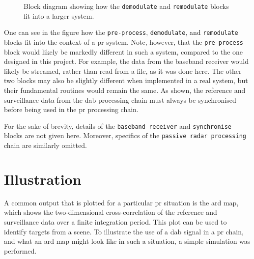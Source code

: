 \documentclass[class=report,11pt,crop=false]{standalone}
\begin{document}
\begin{figure}[htbp]
    \centering
    \captionsetup{type=figure}
    \def\svgwidth{\linewidth}
    { %
    \scriptsize
    }
    \caption{Block diagram showing how the \texttt{demodulate} and \texttt{remodulate} blocks fit into a larger  system.}
    \label{fig:BD_pr-integration}
\end{figure}

One can see in the figure how the \texttt{pre-process}, \texttt{demodulate}, and \texttt{remodulate} blocks fit into the context of a \gls{pr} system. Note, however, that the \texttt{pre-process} block would likely be markedly different in such a system, compared to the one designed in this project. For example, the data from the baseband receiver would likely be streamed, rather than read from a file, as it was done here. The other two blocks may also be slightly different when implemented in a real system, but their fundamental routines would remain the same. As shown, the reference and surveillance data from the \gls{dab} processing chain must always be synchronised before being used in the \gls{pr} processing chain.

For the sake of brevity, details of the \texttt{baseband receiver} and \texttt{synchronise} blocks are not given here. Moreover, specifics of the \texttt{passive radar processing} chain are similarly omitted.

\section{Illustration}
A common output that is plotted for a particular \gls{pr} situation is the \gls{ard} map, which shows the two-dimensional cross-correlation of the reference and surveillance data over a finite integration period. This plot can be used to identify targets from a scene. To illustrate the use of a \gls{dab} signal in a \gls{pr} chain, and what an \gls{ard} map might look like in such a situation, a simple simulation was performed.
\end{document}
